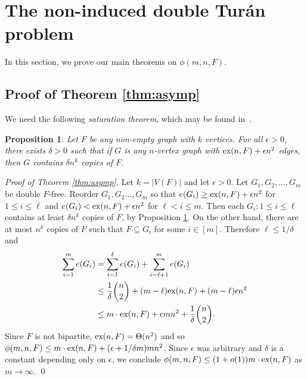 \documentclass[12pt]{article}
\newtheorem{proposition}[theorem]{Proposition}
\newcommand*{\ex}{\textnormal{ex}}
\begin{document}
\section{The non-induced double Tur\'{a}n problem}

In this section, we prove our main theorems on $\phi(m, n, F)$. 

\subsection{Proof of Theorem \ref{thm:asymp}}

We need the following \textit{saturation theorem}, which may be found in~\cite{ErdosSimonovits1983}.

\begin{proposition}\label{thm:sat}
Let $F$ be any non-empty graph with $k$ vertices.
For all $\epsilon > 0$, there exists $\delta > 0$ such that if $G$ is any $n$-vertex graph with $\ex(n,F) + \epsilon n^2$ edges, then 
$G$ contains $\delta n^k$ copies of $F$. 
\end{proposition}

\textit{Proof of Theorem \ref{thm:asymp}.}
  Let $k = |V(F)|$ and let $\epsilon > 0$. Let $G_1,G_2,\dots,G_m$ be double $F$-free. 
  Reorder $G_1,G_2 \ldots, G_m$ so that 
  $e(G_i) \geq \ex(n,F) + \epsilon n^2$ for $1 \leq i \leq \ell$ and $e(G_i) <\ex(n,F) + \epsilon n^2$ for $\ell < i \leq m$. Then each $G_i : 1 \leq i \leq \ell$ contains at least $\delta n^k$ copies of $F$, by Proposition \ref{thm:sat}. On the other hand, there are at most $n^k$ copies of $F$ 
  such that $F \subseteq G_i$ for some $i \in [m]$. 
  Therefore $\ell \leq 1/\delta$ and
  \begin{align*}
    \sum_{i = 1}^m e(G_i) 
    &= \sum_{i = 1}^{\ell} e(G_i) + \sum_{i =\ell + 1}^m e(G_i) \\
    &\leq \frac{1}{\delta}\binom{n}{2} + (m - \ell)\ex(n,F) + (m - \ell) \epsilon n^2 \\
    &\leq m \cdot \ex(n,F) + \epsilon m n^2 + \frac{1}{\delta}\binom{n}{2}.
  \end{align*}
Since $F$ is not bipartite, $\ex(n,F) = \Theta(n^2)$ and so $\phi(m, n, F) \leq m \cdot \ex(n,F) + (\epsilon + 1/\delta m)mn^2$. Since $\epsilon$ was arbitrary and $\delta$ is a constant depending only on $\epsilon$, 
we conclude $\phi(m, n, F) \leq (1 + o(1))m \cdot \ex(n,F)$ as $m \rightarrow \infty$. \qed
\end{document}
